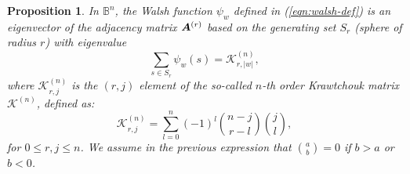 \documentclass{article}
\newtheorem{proposition}{Proposition}
\def\vec#1{\mathchoice{\mbox{\boldmath$\displaystyle#1$}}
  {\mbox{\boldmath$\textstyle#1$}}
  {\mbox{\boldmath$\scriptstyle#1$}}
  {\mbox{\boldmath$\scriptscriptstyle#1$}}}
\newcommand{\comb}[2]{\binom{#1}{#2}}
\newcommand{\Bo}[0]{\mathbb{B}}
\newcommand{\krawel}[3]{\mathcal{K}^{#1}_{#2,#3}}
\newcommand{\kraw}[1]{\mathcal{K}^{#1}}
\begin{document}
\begin{proposition}
\label{prop:eigenvalue-walsh}
In $\Bo^n$, the Walsh function $\psi_w$ defined in (\ref{eqn:walsh-def}) is an eigenvector of the adjacency matrix $\vec{A}^{(r)}$ based on the generating set $S_r$ (sphere of radius $r$) with eigenvalue
\begin{equation}
\label{eqn:eigenvalue-walsh}
\sum_{s \in S_r} \psi_w (s) = \krawel{(n)}{r}{|w|},
\end{equation}
where $\krawel{(n)}{r}{j}$ is the $(r,j)$ element of the so-called $n$-th order Krawtchouk matrix $\kraw{(n)}$, defined as:
\begin{equation}
\label{eqn:kra-def}
\krawel{(n)}{r}{j} = \sum_{l=0}^{n} (-1)^ l \comb{n-j}{r-l}\comb{j}{l},
\end{equation}
for $0\leq r,j \leq n$. We assume in the previous expression that $\comb{a}{b} =0$ if $b > a$ or $b < 0$. 
\end{proposition}
\end{document}
